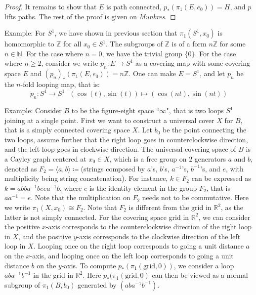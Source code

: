 \documentclass[11pt]{book}
\theoremstyle{break}
\theoremstyle{break}
\newcommand{\R}{\mathbb{R}}
\newcommand{\N}{\mathbb{N}}
\newcommand{\Z}{\mathbb{Z}}
\newcommand{\that}[1]{\widetilde{#1}}
\newcommand{\example}{\color{green}Example: \color{black}}
\begin{document}
\begin{proof}
It remains to show that $E$ is path connected, $p_*(\pi_1(E,e_0)) = H$, and $p$ lifts paths. The rest of the proof is given on \textit{Munkres}.
\end{proof}

\example For $S^1$, we have shown in previous section that $\pi_1(S^1,x_0)$ is homomorphic to $\Z$ for all $x_0 \in S^1$. The subgroups of $\Z$ is of a form $n\Z$ for some $n \in \N$. For the case where $n =0$, we have the trivial group $\{0\}$. For the case where $n \geq 2$, consider we write $p_n:E \to S^1$ as a covering map with some covering space $E$ and $(p_n)_*(\pi_1(E,e_0)) = n\Z$. One can make $E = S^1$, and let $p_n$ be the $n$-fold looping map, that is: 
$$p_n: S^1 \to S^1 \ \ \ (\cos(t), \sin(t))\mapsto (\cos(nt), \sin(nt))$$

\example Consider $B$ to be the figure-eight space ``$\infty$", that is two loops $S^1$ joining at a single point. First we want to construct a universal cover $X$ for $B$, that is a simply connected covering space $X$. Let $b_0$ be the point connecting the two loops, assume further that the right loop goes in counterclockwise direction, and the left loop goes in clockwise direction. The universal covering space of $B$ is a Cayley graph centered at $x_0\in X$, which is a free group on $2$ generators $a$ and $b$, denoted as $F_2 = \langle a, b\rangle \coloneqq $(strings composed by $a$'s, $b$'s, $a^{-1}$'s, $b^{-1}$'s, and $e$, with multiplicity being string concatenation). For instance, $k \in F_2$ can be expressed as $k = abba^{-1}beea^{-1}b$, where $e$ is the identity element in the group $F_2$, that is $aa^{-1} = e$. Note that the multiplication on $F_2$ needs not to be commutative. Here we write $\pi_1(X,x_0) \cong F_2$. Note that $F_2$ is different from the grid in $\R^2$, as the latter is not simply connected. For the covering space grid in $\R^2$, we can consider the positive $x$-axis corresponds to the counterclockwise direction of the right loop in $X$, and the positive $y$-axis corresponds to the clockwise direction of the left loop in $X$. Looping once on the right loop corresponds to going a unit distance $a$ on the $x$-axis, and looping once on the left loop corresponds to going a unit distance $b$ on the $y$-axis. To compute $p_*(\pi_1(\text{grid},0))$, we consider a loop $aba^{-1}b^{-1}$ in the grid in $\R^2$. Here $p_*(\pi_1(\text{grid},0)$ can then be viewed as a normal subgroup of $\pi_1(B, b_0)$ generated by $(aba^{-1}b^{-1})$.\\
\end{document}

